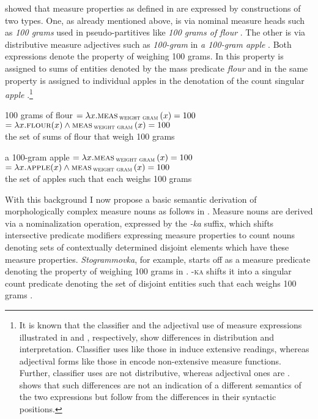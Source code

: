 \documentclass[output=paper,
colorlinks,
citecolor=brown,
newtxmath
]{langscibook}
\begin{document}
\noindent \citet{Rothstein2017} showed that measure properties as defined in  are expressed by constructions of two types. One, as already mentioned above, is via nominal measure heads such as \textit{100 grams} used in pseudo-partitives like \textit{100 grams of flour} . The other is via distributive measure adjectives such as \textit{100-gram} in \textit{a 100-gram apple} . Both expressions denote the property of weighing 100 grams. In  this property is assigned to sums of entities denoted by the mass predicate \textit{flour}  and in  the same property is assigned to individual apples in the denotation of the count singular \textit{apple} .\footnote{It is known that the classifier and the adjectival use of measure expressions illustrated in  and , respectively, show differences in distribution and interpretation. Classifier uses like those in  induce extensive readings, whereas adjectival forms like those in  encode non-extensive measure functions. Further, classifier uses are not distributive, whereas adjectival ones are \citep{Schwarzschild2005}. \citet{Rothstein2017} shows that such differences are not an indication of a different semantics of the two expressions but follow from the differences in their syntactic positions.}

    \largerpage[2] %

\ea\label{ex:15} 100 grams of flour
    \ea\label{ex:15a}  $= \lambda x. \textsc{meas}\,\textsubscript{\textsc{weight gram}}\,(x)= 100$
    \ex\label{ex:15b}  $= \lambda x. \textsc{flour}(x) \wedge \textsc{meas}\,\textsubscript{\textsc{weight gram}}\,(x) = 100$\\
    {\small the set of sums of flour that weigh 100 grams}
    \z
\z

\ea\label{ex:16} a 100-gram apple
    \ea\label{ex:16a}  $= \lambda x. \textsc{meas}\, \textsubscript{\textsc{weight gram}}\,(x) = 100$
    \ex\label{ex:16b}  $= \lambda x. \textsc{apple}(x) \wedge \textsc{meas}\,\textsubscript{\textsc{weight gram}}\,(x) = 100$\\
    {\small the set of apples such that each weighs 100 grams}
    \z
\z

\noindent With this background I now propose a basic semantic derivation of morphologically complex measure nouns as follows in . Measure nouns are derived via a nominalization operation, expressed by the \textit{-ka} suffix, which shifts intersective predicate modifiers expressing measure properties to count nouns denoting sets of contextually determined disjoint elements which have these measure properties. \textit{Stogrammovka}, for example, starts off as a measure predicate denoting the property of weighing 100 grams in . \textsc{-ka} shifts it into a singular count predicate denoting the set of disjoint entities such that each weighs 100 grams .
\end{document}
